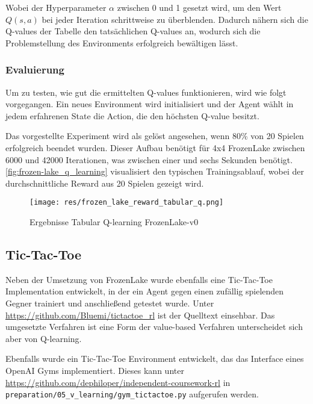 \documentclass[11pt]{scrartcl}
\begin{document}
Wobei der Hyperparameter $\alpha$ zwischen 0 und 1 gesetzt wird, um den Wert $Q(s, a)$ bei %
jeder Iteration schrittweise zu überblenden. Dadurch nähern sich die Q-values der Tabelle
den tatsächlichen Q-values an, wodurch sich die Problemstellung des Environments erfolgreich 
bewältigen lässt.

\subsubsection{Evaluierung}
Um zu testen, wie gut die ermittelten Q-values funktionieren, wird wie folgt vorgegangen.
Ein neues Environment wird initialisiert und der Agent wählt in jedem erfahrenen State die
Action, die den höchsten Q-value besitzt.

Das vorgestellte Experiment wird als gelöst angesehen, wenn 80\% von 20 Spielen erfolgreich
beendet wurden. Dieser Aufbau benötigt für 4x4 FrozenLake zwischen 6000 und 42000
Iterationen, was zwischen einer und sechs Sekunden benötigt.
\autoref{fig:frozen-lake_q_learning} visualisiert den typischen Trainingsablauf, wobei der
durchschnittliche Reward aus 20 Spielen gezeigt wird.

\begin{figure}[htp]
\centering
\texttt{[image: res/frozen\_lake\_reward\_tabular\_q.png]}
\caption{Ergebnisse Tabular Q-learning FrozenLake-v0}
\label{fig:frozen-lake_q_learning}
\end{figure}

\subsection{Tic-Tac-Toe}
Neben der Umsetzung von FrozenLake wurde ebenfalls eine Tic-Tac-Toe Implementation
entwickelt, in der ein Agent gegen einen zufällig spielenden Gegner trainiert und
anschließend getestet wurde. Unter \url{https://github.com/Bluemi/tictactoe_rl} ist
der Quelltext einsehbar. Das umgesetzte Verfahren ist eine Form der value-based
Verfahren unterscheidet sich aber von Q-learning.

Ebenfalls wurde ein Tic-Tac-Toe Environment entwickelt, das das Interface eines OpenAI
Gyms implementiert. Dieses kann unter
\url{https://github.com/dephiloper/independent-coursework-rl} in
\lstinline!preparation/05_v_learning/gym_tictactoe.py! aufgerufen werden.
\end{document}
